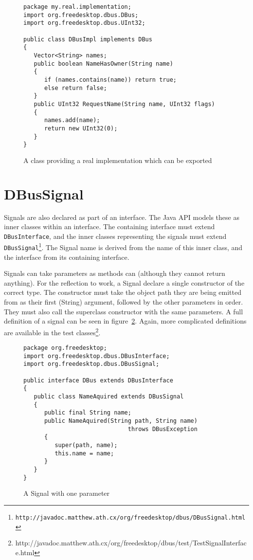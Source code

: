 \documentclass[a4paper,12pt]{article}
\begin{document}
\begin{figure}[htb]
\begin{center}
\begin{verbatim}
package my.real.implementation;
import org.freedesktop.dbus.DBus;
import org.freedesktop.dbus.UInt32;

public class DBusImpl implements DBus
{
   Vector<String> names;
   public boolean NameHasOwner(String name)
   {
      if (names.contains(name)) return true;
      else return false;
   }
   public UInt32 RequestName(String name, UInt32 flags)
   {
      names.add(name);
      return new UInt32(0);
   }
}
\end{verbatim}
\end{center}
\caption{A class providing a real implementation which can be exported}
\label{fig:class}
\end{figure}

\section{DBusSignal}

Signals are also declared as part of an interface. The Java API
models these as inner classes within an interface. The containing
interface must extend {\tt DBusInterface}, and the inner classes
representing the signals must extend {\tt
DBusSignal\footnote{http://javadoc.matthew.ath.cx/org/freedesktop/dbus/DBusSignal.html}}.
The Signal name is derived from the name of this inner class, and
the interface from its containing interface.

Signals can take parameters as methods can (although they cannot return
      anything). For the reflection to work, a Signal declare a single
constructor of the correct type. The constructor must  take the object path
they are being emitted from as their first (String) argument, followed by the
other parameters in order. They must also call the superclass constructor with
the same parameters.  A full definition of a signal can be seen in
figure~\ref{fig:signal}. Again, more complicated definitions are available in
the test
classes\footnote{http://javadoc.matthew.ath.cx/org/freedesktop/dbus/test/TestSignalInterface.html}.

\begin{figure}[htb]
\begin{center}
\begin{verbatim}
package org.freedesktop;
import org.freedesktop.dbus.DBusInterface;
import org.freedesktop.dbus.DBusSignal;

public interface DBus extends DBusInterface
{
   public class NameAquired extends DBusSignal
   {
      public final String name;
      public NameAquired(String path, String name) 
                              throws DBusException
      {
         super(path, name);
         this.name = name;
      }
   }
}
\end{verbatim}
\end{center}
\caption{A Signal with one parameter}
\label{fig:signal}
\end{figure}
\end{document}
